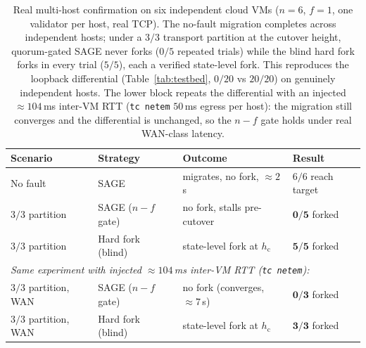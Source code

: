 \documentclass[journal]{IEEEtran}
\theoremstyle{definition}
\theoremstyle{remark}
\begin{document}
\begin{table}[t]
\centering
\caption{Real multi-host confirmation on six independent cloud VMs ($n{=}6$, $f{=}1$, one
validator per host, real TCP). The no-fault migration completes across independent hosts;
under a $3/3$ transport partition at the cutover height, quorum-gated SAGE never forks
($0/5$ repeated trials) while the blind hard fork forks in every trial ($5/5$), each a
verified state-level fork. This reproduces the loopback differential
(Table~\ref{tab:testbed}, $0/20$ vs $20/20$) on genuinely independent hosts. The lower block
repeats the differential with an injected $\approx 104$\,ms inter-VM RTT (\texttt{tc netem}
$50$\,ms egress per host): the migration still converges and the differential is unchanged,
so the $n{-}f$ gate holds under real WAN-class latency.}
\label{tab:multihost}
\setlength{\tabcolsep}{5pt}
\renewcommand{\arraystretch}{1.2}
\footnotesize
\begin{tabular}{p{}p{}p{}p{}}
\toprule
Scenario & Strategy & Outcome & Result \\
\midrule
No fault           & SAGE      & migrates, no fork, $\approx 2$\,s & $6/6$ reach target \\
$3/3$ partition    & SAGE ($n{-}f$ gate) & no fork, stalls pre-cutover & $\mathbf{0/5}$ forked \\
$3/3$ partition    & Hard fork (blind)   & state-level fork at $h_{\mathrm{c}}$ & $\mathbf{5/5}$ forked \\
\midrule
\multicolumn{4}{l}{\emph{Same experiment with injected $\approx 104$\,ms inter-VM RTT (\texttt{tc netem}):}} \\
$3/3$ partition, WAN & SAGE ($n{-}f$ gate) & no fork (converges, $\approx 7$\,s) & $\mathbf{0/3}$ forked \\
$3/3$ partition, WAN & Hard fork (blind)   & state-level fork at $h_{\mathrm{c}}$ & $\mathbf{3/3}$ forked \\
\bottomrule
\end{tabular}
\end{table}
\end{document}
